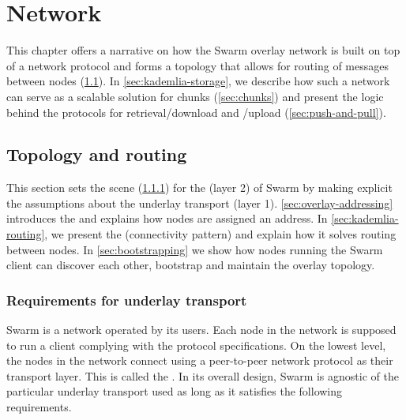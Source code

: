 \chapter{Network}\label{sec:network}

This chapter offers a narrative on how the Swarm overlay network is built on top of a  network protocol and forms a topology that allows for routing of messages between nodes (\ref{sec:topology-routing}). In \ref{sec:kademlia-storage}, we describe how such a network can serve as a scalable  solution for chunks (\ref{sec:chunks}) and present the logic behind the protocols for retrieval/download and /upload (\ref{sec:push-and-pull}).

\section{Topology and routing}\label{sec:topology-routing}

This section sets the scene (\ref{sec:underlay-transport}) for the  (layer 2) of Swarm by making explicit the assumptions about the underlay transport (layer 1). \ref{sec:overlay-addressing} introduces the  and explains how nodes are assigned an address. In  \ref{sec:kademlia-routing}, we present the   (connectivity pattern) and explain how it solves routing between nodes. In \ref{sec:bootstrapping} we show how nodes running the Swarm client can discover each other, bootstrap and maintain the overlay topology.

\subsection{Requirements for underlay transport}\label{sec:underlay-transport} 

\yellow{}

Swarm is a network operated by its users. Each node in the network is supposed to run a client complying with the protocol specifications. On the lowest level, the nodes in the network connect using a peer-to-peer network protocol as their transport layer. This is called the . 
In its overall design, Swarm is agnostic of the particular underlay transport used as long as it satisfies the following requirements.

